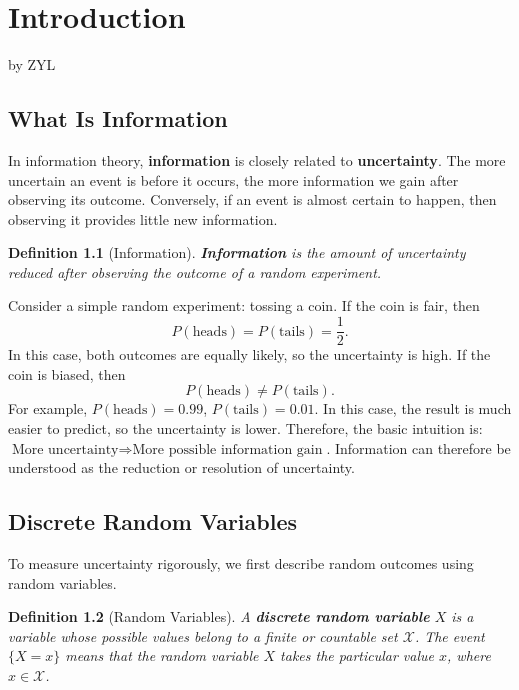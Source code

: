 \documentclass[11pt]{report}
\theoremstyle{lecturedefinition}
\newtheorem{definition}{Definition}
\theoremstyle{lectureremark}
\begin{document}
\chapter{Introduction}
\begin{center}
by ZYL
\end{center}
\section{What Is Information}
In information theory, \textbf{information} is closely related to \textbf{uncertainty}. The more uncertain an event is before it occurs, the more information we gain after observing its outcome. Conversely, if an event is almost certain to happen, then observing it provides little new information.

\begin{definition}[Information]
\textbf{Information} is the amount of uncertainty reduced after observing the outcome of a random experiment.
\end{definition}

Consider a simple random experiment: tossing a coin. If the coin is fair, then
\begin{equation}
P(\text{heads})=P(\text{tails})=\frac{1}{2}.
\end{equation}
In this case, both outcomes are equally likely, so the uncertainty is high. If the coin is biased, then
\begin{equation}
    P(\text{heads})\ne P(\text{tails}).
\end{equation}
For example, $P(\text{heads})=0.99$, $P(\text{tails})=0.01$. In this case, the result is much easier to predict, so the uncertainty is lower. Therefore, the basic intuition is: $\text{More uncertainty}\Rightarrow \text{More possible information gain}$. Information can therefore be understood as the reduction or resolution of uncertainty.

\section{Discrete Random Variables}
To measure uncertainty rigorously, we first describe random outcomes using random variables.

\begin{definition}[Random Variables]
A \textbf{discrete random variable} $X$ is a variable whose possible values belong to a finite or countable set $\mathcal{X}$. The event $\{X=x\}$ means that the random variable $X$ takes the particular value $x$, where $x\in \mathcal{X}$.
\end{definition}
\end{document}
